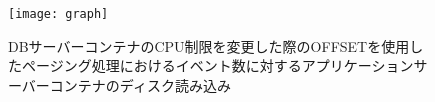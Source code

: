 \documentclass[../../../../../main]{subfiles}
\begin{document}
    \begin{figure}[H]
        \centering
        \texttt{[image: graph]}
        \caption{DBサーバーコンテナのCPU制限を変更した際のOFFSETを使用したページング処理におけるイベント数に対するアプリケーションサーバーコンテナのディスク読み込み}
        \label{fig:paging-offset-change-db-cpu-limit-app-disk-out-app_4_8192-db_1024}
    \end{figure}
\end{document}
